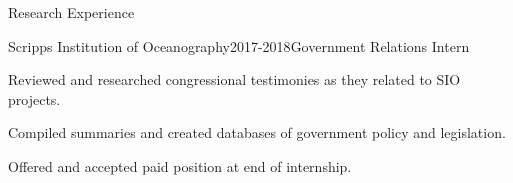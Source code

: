 \documentclass[10pt]{resume} %
\begin{document}
\begin{rSection}{Research Experience}
		\begin{rSubsection}{Scripps Institution of Oceanography}{2017-2018}{Government Relations Intern}{}
			\item Reviewed and researched congressional testimonies as they related to SIO projects.
			\item Compiled summaries and created databases of government policy and legislation.
			\item Offered and accepted paid position at end of internship.
		\end{rSubsection}
		
	\end{rSection}
	
	
\end{document}
